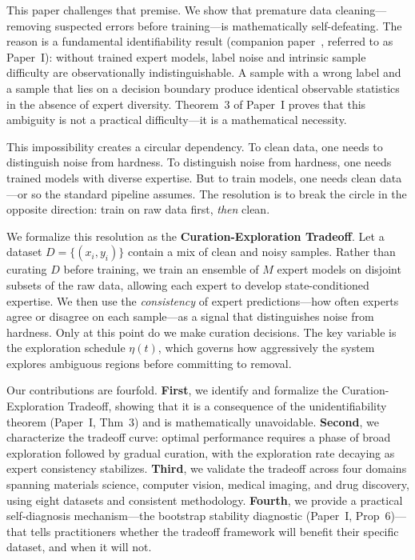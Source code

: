 \documentclass[12pt,a4paper]{article}
\begin{document}
This paper challenges that premise. We show that premature data cleaning---removing suspected errors before training---is mathematically self-defeating. The reason is a fundamental identifiability result (companion paper~\cite{xi2025fundamental}, referred to as Paper~I): without trained expert models, label noise and intrinsic sample difficulty are observationally indistinguishable. A sample with a wrong label and a sample that lies on a decision boundary produce identical observable statistics in the absence of expert diversity. Theorem~3 of Paper~I proves that this ambiguity is not a practical difficulty---it is a mathematical necessity.

This impossibility creates a circular dependency. To clean data, one needs to distinguish noise from hardness. To distinguish noise from hardness, one needs trained models with diverse expertise. But to train models, one needs clean data---or so the standard pipeline assumes. The resolution is to break the circle in the opposite direction: train on raw data first, \emph{then} clean.

We formalize this resolution as the \textbf{Curation-Exploration Tradeoff}. Let a dataset $D = \{(x_i, y_i)\}$ contain a mix of clean and noisy samples. Rather than curating $D$ before training, we train an ensemble of $M$ expert models on disjoint subsets of the raw data, allowing each expert to develop state-conditioned expertise. We then use the \emph{consistency} of expert predictions---how often experts agree or disagree on each sample---as a signal that distinguishes noise from hardness. Only at this point do we make curation decisions. The key variable is the exploration schedule $\eta(t)$, which governs how aggressively the system explores ambiguous regions before committing to removal.

Our contributions are fourfold. \textbf{First}, we identify and formalize the Curation-Exploration Tradeoff, showing that it is a consequence of the unidentifiability theorem (Paper~I, Thm~3) and is mathematically unavoidable. \textbf{Second}, we characterize the tradeoff curve: optimal performance requires a phase of broad exploration followed by gradual curation, with the exploration rate decaying as expert consistency stabilizes. \textbf{Third}, we validate the tradeoff across four domains spanning materials science, computer vision, medical imaging, and drug discovery, using eight datasets and consistent methodology. \textbf{Fourth}, we provide a practical self-diagnosis mechanism---the bootstrap stability diagnostic (Paper~I, Prop~6)---that tells practitioners whether the tradeoff framework will benefit their specific dataset, and when it will not.
\end{document}
